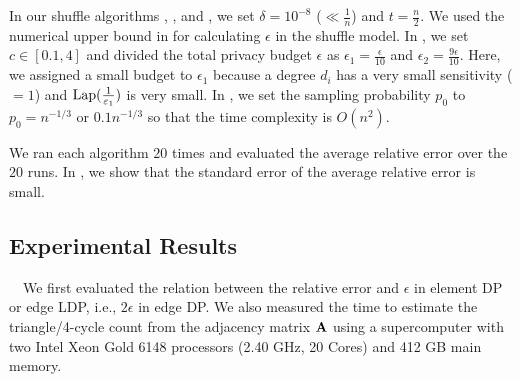 In our shuffle algorithms \AlgWSTriVR{}, \AlgWSTri{}, and \AlgWSCyc{}, we set $\delta = 10^{-8}$ ($\ll \frac{1}{n}$) and $t=\frac{n}{2}$. 
We used the numerical upper bound in \cite{Feldman_FOCS21} for calculating $\epsilon$ in the shuffle model. 
In \AlgWSTriVR{}, we set 
$c\in[0.1,4]$ 
and 
divided the total privacy budget $\epsilon$ as $\epsilon_1 = \frac{\epsilon}{10}$ and $\epsilon_2 = \frac{9\epsilon}{10}$. 
Here, we assigned a small budget to $\epsilon_1$ because a degree $d_i$ has a very small sensitivity ($=1$) and $\textrm{Lap}(\frac{1}{\varepsilon_1})$ is very small. 
In \AlgARRTri{}, we set the sampling probability $p_0$ to $p_0 = n^{-1/3}$ or $0.1n^{-1/3}$ so that the time complexity is $O(n^2)$. 

We ran each algorithm $20$ times and evaluated the average relative error over the $20$ runs. 
In , we show that the standard error of the average relative error is small. 

\subsection{Experimental Results}
\label{chap3-sub:results}

{}~~We first evaluated the relation between the relative error and 
$\epsilon$ in element DP or edge LDP, i.e., $2\epsilon$ in edge DP. 
We also measured the time to estimate the triangle/4-cycle count from the adjacency matrix $\mathbf{A}$ using a supercomputer \cite{ABCI} with two Intel Xeon Gold 6148 processors (2.40 GHz, 20 Cores) and 412 GB main memory. 

